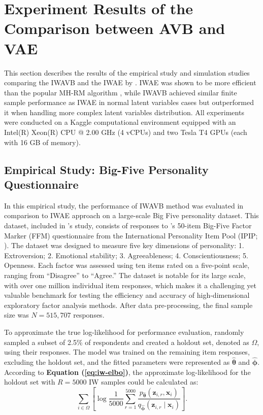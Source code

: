 \documentclass[a4paper,12pt]{article}
\theoremstyle{plain} %
\theoremstyle{remark} %
\theoremstyle{definition} %
\begin{document}
\section{Experiment Results of the Comparison between AVB and VAE}
This section describes the results of the empirical study and simulation studies comparing the IWAVB and the IWAE by \citet{urban2021deep}. IWAE was shown to be more efficient \citep{urban2021deep} than the popular MH-RM algorithm \citep{cai2010high}, while IWAVB achieved similar finite sample performance as IWAE in normal latent variables cases but outperformed it when handling more complex latent variables distribution. All experiments were conducted on a Kaggle computational environment equipped with an Intel(R) Xeon(R) CPU @ 2.00 GHz (4 vCPUs) and two Tesla T4 GPUs (each with 16 GB of memory).

\subsection{Empirical Study: Big-Five Personality Questionnaire}
In this empirical study, the performance of IWAVB method was evaluated in comparison to IWAE approach on a large-scale Big Five personality dataset. This dataset, included in \citet{urban2021deep}'s study, consists of responses to 
 \citet{goldberg1992development}'s 50-item Big-Five Factor Marker (FFM) questionnaire from the International Personality Item Pool (IPIP; \citealp{goldberg2006international}). The dataset was designed to measure five key dimensions of personality: 1. Extroversion; 2. Emotional stability; 3. Agreeableness; 4. Conscientiousness; 5. Openness. Each factor was assessed using ten items rated on a five-point scale, ranging from ``Disagree'' to ``Agree.'' The dataset is notable for its large scale, with over one million individual item responses, which makes it a challenging yet valuable benchmark for testing the efficiency and accuracy of high-dimensional exploratory factor analysis methods. After data pre-processing, the final sample size was $N=515,707$ responses.

To approximate the true log-likelihood for performance evaluation, \citet{urban2021deep} randomly sampled a subset of 2.5\% of respondents and created a holdout set, denoted as $\Omega$, using their responses. The model was trained on the remaining item responses, excluding the holdout set, and the fitted parameters were represented as $\hat{\bm{\theta}}$ and $\hat{\bm{\phi}}$. According to \textbf{Equation (\ref{eq:iw-elbo})}, the approximate log-likelihood for the holdout set with $R=5000$ IW samples could be calculated as:
\begin{equation}\label{eq:appro_ll}
    \sum\limits_{i\in\Omega}\left[\log\frac{1}{5000}\sum\limits_{r=1}^{5000}\frac{p_{\hat{\bm{\theta}}}(\bm{z}_{i,r},\bm{x}_i)}{q_{\hat{\bm{\phi}}}(\bm{z}_{i,r}\mid\bm{x}_i)}\right].
\end{equation}
\end{document}
